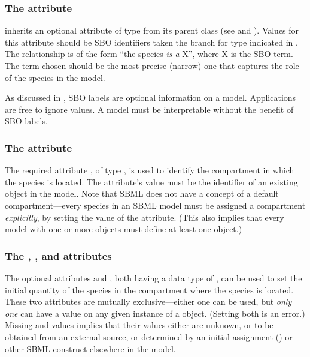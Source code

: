 \subsubsection{The  attribute}
\label{sec:species-sboterm}

\Species inherits an optional  attribute of type
 from its parent class \SBase (see
 and ).  Values
for this attribute should be SBO identifiers taken the branch for
type \Species indicated in .
The relationship is of the form ``the species \emph{is-a} X'',
where X is the SBO term.  The term chosen should be the most
precise (narrow) one that captures the role of the species in the
model.

As discussed in , SBO labels are optional
information on a model.  Applications are free to ignore
 values.  A model must be interpretable without the
benefit of SBO labels.


\subsubsection{The  attribute}
\label{sec:species-compartment}

The required attribute , of type
, is used to identify the compartment in which
the species is located.  The attribute's value must be the
identifier of an existing \Compartment object in the model.  Note
that SBML does not have a concept of a default compartment---every
species in an SBML model must be assigned a compartment
\emph{explicitly}, by setting the value of the 
attribute.  (This also implies that every model with one or more
\Species objects must define at least one \Compartment object.)


\subsubsection{The ,
  , and  attributes}
\label{sec:initialAmount}
\label{sec:species-substanceunits}

The optional attributes  and
, both having a data type of
, can be used to set the initial quantity of the
species in the compartment where the species is located.  These
two attributes are mutually exclusive---either one can be used,
but \emph{only one} can have a value on any given instance of a
\Species object.  (Setting both is an error.)
Missing  and
 values implies that their values
either are unknown, or to be obtained from an external source, or
determined by an initial assignment
() or other SBML construct
elsewhere in the model.


